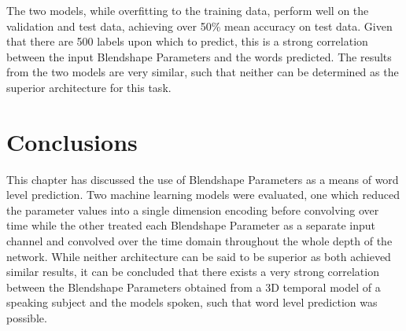 The two models, while overfitting to the training data, perform well on the validation and test data, achieving over 50\% mean accuracy on test data.
Given that there are 500 labels upon which to predict, this is a strong correlation between the input Blendshape Parameters and the words predicted.
The results from the two models are very similar, such that neither can be determined as the superior architecture for this task.

\section{Conclusions}
This chapter has discussed the use of Blendshape Parameters as a means of word level prediction.
Two machine learning models were evaluated, one which reduced the parameter values into a single dimension encoding before convolving over time while the other treated each Blendshape Parameter as a separate input channel and convolved over the time domain throughout the whole depth of the network.
While neither architecture can be said to be superior as both achieved similar results, it can be concluded that there exists a very strong correlation between the Blendshape Parameters obtained from a 3D temporal model of a speaking subject and the models spoken, such that word level prediction was possible.
